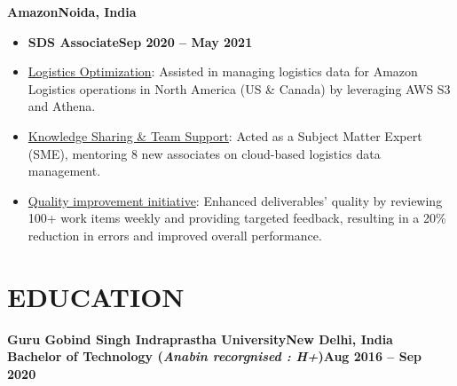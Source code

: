 \documentclass[11pt,a4paper]{article}
\newenvironment{dashlist}{
  \begin{itemize}[label={--}]
}{
  \end{itemize}
}
\begin{document}
\noindent\textbf{Amazon\hfill Noida, India}
\begin{itemize}
\item \textbf{SDS Associate\hfill Sep 2020 – May 2021}
\end{itemize}
\begin{dashlist}
    \item \uline {Logistics Optimization}: Assisted in managing logistics data for Amazon Logistics operations in North America (US \& Canada) by leveraging AWS S3 and Athena.
    \item \uline {Knowledge Sharing \& Team Support}: Acted as a Subject Matter Expert (SME), mentoring 8 new associates on cloud-based logistics data management.
    \item \uline {Quality improvement initiative}: Enhanced deliverables' quality by reviewing 100+ work items weekly and providing targeted feedback, resulting in a 20\% reduction in errors and improved overall performance.
\end{dashlist}

\section*{EDUCATION}
\noindent\textbf{Guru Gobind Singh Indraprastha University\hfill New Delhi, India\\
Bachelor of Technology (\textit{Anabin recorgnised : H+})\hfill Aug 2016 – Sep 2020}
\end{document}
